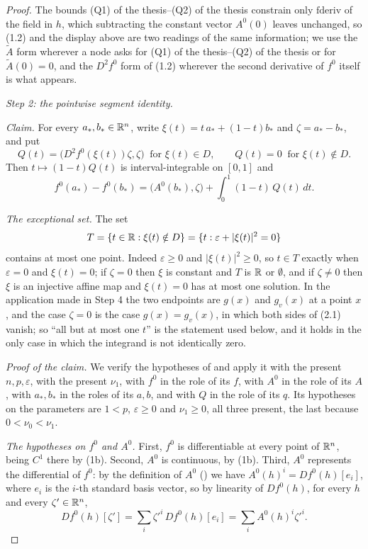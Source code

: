 \begin{proof}
The bounds (Q1) of the thesis--(Q2) of the thesis constrain only
$\mathrm{fderiv}$ of the field in $h$, which subtracting the constant vector
$A^0(0)$ leaves unchanged, so (1.2) and the display above are two readings of the
same information; we use the $\widetilde A$ form wherever a node asks for
(Q1) of the thesis--(Q2) of the thesis or for $\widetilde A(0)=0$, and the $D^2f^0$ form of
(1.2) wherever the second derivative of $f^0$ itself is what appears.

\medskip
\noindent\emph{Step 2: the pointwise segment identity.}

\emph{Claim.}  For every $a_\ast,b_\ast\in\mathbb{R}^n$, write
$\xi(t)=t\,a_\ast+(1-t)b_\ast$ and $\zeta=a_\ast-b_\ast$, and put
\[
Q(t)=\bigl(D^2f^0(\xi(t))\zeta,\zeta\bigr)\ \text{ for }\xi(t)\in D,
\qquad Q(t)=0\ \text{ for }\xi(t)\notin D .
\]
Then $t\mapsto(1-t)Q(t)$ is interval-integrable on $[0,1]$ and
\[
f^0(a_\ast)-f^0(b_\ast)
=\bigl(A^0(b_\ast),\zeta\bigr)
+\int_0^1(1-t)\,Q(t)\,dt .
\tag{2.1}
\]

\emph{The exceptional set.}  The set
\[
T=\{t\in\mathbb{R}:\xi(t)\notin D\}=\{t:\varepsilon+|\xi(t)|^2=0\}
\]
contains at most one point.  Indeed $\varepsilon\ge0$ and $|\xi(t)|^2\ge0$, so
$t\in T$ exactly when $\varepsilon=0$ and $\xi(t)=0$; if $\zeta=0$ then $\xi$ is
constant and $T$ is $\mathbb{R}$ or $\emptyset$, and if $\zeta\ne0$ then $\xi$ is an
injective affine map and $\xi(t)=0$ has at most one solution.  In the
application made in Step 4 the two endpoints are $g(x)$ and $g_v(x)$ at a point
$x$, and the case $\zeta=0$ is the case $g(x)=g_v(x)$, in which both sides of
(2.1) vanish; so ``all but at most one $t$'' is the statement used below, and
it holds in the only case in which the integrand is not identically zero.

\emph{Proof of the claim.}  We verify the hypotheses of
 and apply it with the present
$n,p,\varepsilon$, with the present $\nu_1$, with $f^0$ in the role of its $f$,
with $A^0$ in the role of its $A$, with $a_\ast,b_\ast$ in the roles of its
$a,b$, and with $Q$ in the role of its $q$.  Its hypotheses on the parameters
are $1<p$, $\varepsilon\ge0$ and $\nu_1\ge0$, all three present, the last
because $0<\nu_0<\nu_1$.

\emph{The hypotheses on $f^0$ and $A^0$.}  First, $f^0$ is differentiable at
every point of $\mathbb{R}^n$, being $C^1$ there by (1b).  Second, $A^0$ is continuous,
by (1b).  Third, $A^0$ represents the differential of $f^0$: by the definition
of $A^0$ () we have
$A^0(h)^i=Df^0(h)[e_i]$, where $e_i$ is the $i$-th standard basis vector, so by
linearity of $Df^0(h)$, for every $h$ and every $\zeta'\in\mathbb{R}^n$,
\[
Df^0(h)[\zeta']=\sum_i\zeta'^i\,Df^0(h)[e_i]=\sum_iA^0(h)^i\zeta'^i .
\]


\end{proof}
